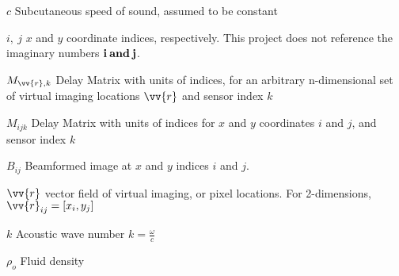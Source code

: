 \begin{eqlist}

\item[$c$] Subcutaneous speed of sound, assumed to be constant

\item[$i, \: j$] $x$ and $y$ coordinate indices, respectively. This project does not reference the imaginary numbers $\bf{i} \: and \: \bf{j}$.

\item[$M_{\vv{r},k}$] Delay Matrix with units of indices, for an arbitrary n-dimensional set of virtual imaging locations $\vv{r}$ and sensor index $k$

\item[$M_{ijk}$] Delay Matrix with units of indices for $x$ and $y$ coordinates $i$ and $j$, and sensor index $k$

\item[$B_{ij}$] Beamformed image at $x$ and $y$ indices $i$ and $j$.

\item[$\vv{r}$] vector field of virtual imaging, or pixel locations. For 2-dimensions, $\vv{r}_{ij} = [x_i, y_j]$

\item[$k$] Acoustic wave number $k = \frac{\omega}{c}$

\item[$\rho_o$] Fluid density

\end{eqlist}

